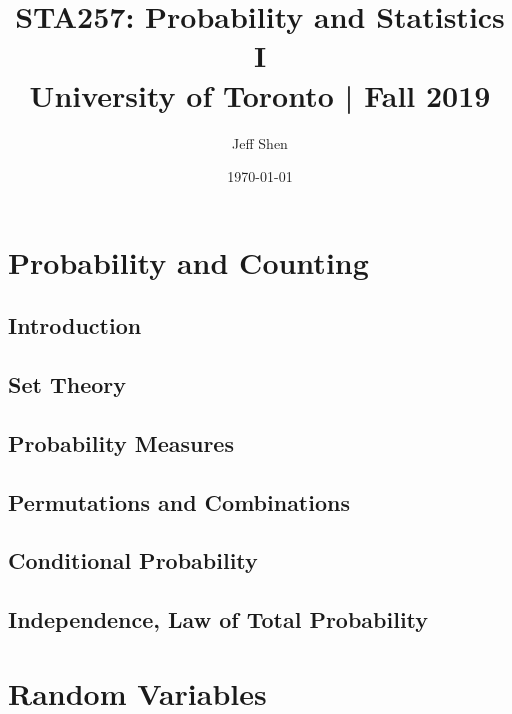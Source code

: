 \documentclass[a4paper,10pt]{article}
\begin{document}
\title{STA257: Probability and Statistics I\\
    \Large University of Toronto | Fall 2019}
\author{Jeff Shen}
\date{\today}
\maketitle
\tableofcontents



\newpage
\section{Probability and Counting}

\subsection{Introduction}

\subsection{Set Theory}

\subsection{Probability Measures}

\subsection{Permutations and Combinations}

\subsection{Conditional Probability}

\subsection{Independence, Law of Total Probability}



\newpage
\section{Random Variables}
\end{document}
